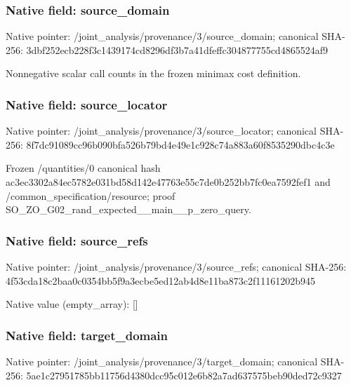 \documentclass[10pt,a4paper]{article}
\begin{document}
\subsubsection{Native field: source\_\allowbreak{}domain}
Native pointer: /joint\_\allowbreak{}analysis/provenance/3/source\_\allowbreak{}domain; canonical SHA-256: 3dbf252ecb228f3c1439174cd8296df3b7a41dfeffc304877755cd4865524af9

\begingroup\raggedright\sloppy Nonnegative scalar call counts in the frozen minimax cost definition.\par\endgroup

\subsubsection{Native field: source\_\allowbreak{}locator}
Native pointer: /joint\_\allowbreak{}analysis/provenance/3/source\_\allowbreak{}locator; canonical SHA-256: 8f7dc91089cc96b090bfa526b79bd4e49e1c928c74a883a60f8535290dbc4c3e

\begingroup\raggedright\sloppy Frozen /\allowbreak{}quantities/\allowbreak{}0 canonical hash ac3ec3302a84ec5782e031bd58d142e47763e55c7de0b252bb7fc0ea7592fef1 and /\allowbreak{}common\_\allowbreak{}specification/\allowbreak{}resource;\allowbreak{} proof SO\_\allowbreak{}ZO\_\allowbreak{}G02\_\allowbreak{}rand\_\allowbreak{}expected\_\allowbreak{}\_\allowbreak{}main\_\allowbreak{}\_\allowbreak{}p\_\allowbreak{}zero\_\allowbreak{}query.\par\endgroup

\subsubsection{Native field: source\_\allowbreak{}refs}
Native pointer: /joint\_\allowbreak{}analysis/provenance/3/source\_\allowbreak{}refs; canonical SHA-256: 4f53cda18c2baa0c0354bb5f9a3ecbe5ed12ab4d8e11ba873c2f11161202b945

Native value (empty\_\allowbreak{}array): []

\subsubsection{Native field: target\_\allowbreak{}domain}
Native pointer: /joint\_\allowbreak{}analysis/provenance/3/target\_\allowbreak{}domain; canonical SHA-256: 5ae1c27951785bb11756d4380dcc95c012e6b82a7ad637575beb90ded72c9327
\end{document}
